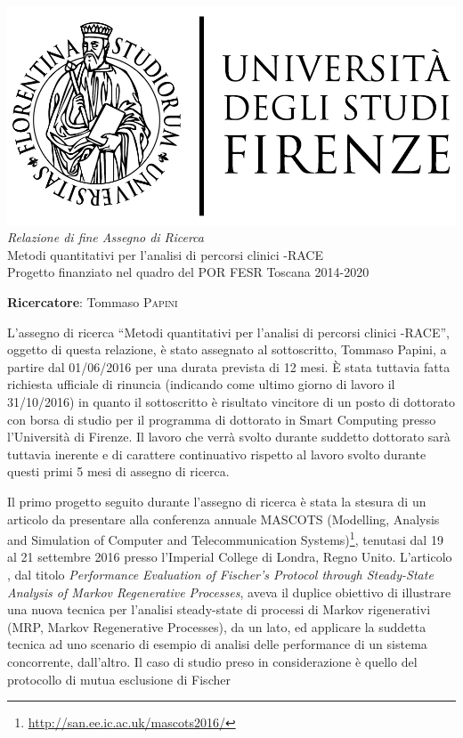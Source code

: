 \documentclass{article}
\begin{document}
    
    \begin{center}
        \includegraphics[scale=0.2]{logo_unifi.jpg}\\[4cm]
        \textit{Relazione di fine Assegno di Ricerca}\\[0.3cm]
        {\Huge Metodi quantitativi per l'analisi di percorsi clinici -RACE}\\[0.2cm]
        Progetto finanziato nel quadro del POR FESR Toscana 2014-2020
    \end{center}
    
    \vfill
    
    \textbf{Ricercatore}: Tommaso \textsc{Papini}
    
    \clearpage
    
    L'assegno di ricerca ``Metodi quantitativi per l'analisi di percorsi clinici -RACE'', oggetto di questa relazione, è stato assegnato al sottoscritto, Tommaso Papini, a partire dal 01/06/2016 per una durata prevista di 12 mesi. È stata tuttavia fatta richiesta ufficiale di rinuncia (indicando come ultimo giorno di lavoro il 31/10/2016) in quanto il sottoscritto è risultato vincitore di un posto di dottorato con borsa di studio per il programma di dottorato in Smart Computing presso l'Università di Firenze. Il lavoro che verrà svolto durante suddetto dottorato sarà tuttavia inerente e di carattere continuativo rispetto al lavoro svolto durante questi primi 5 mesi di assegno di ricerca.
    
    Il primo progetto seguito durante l'assegno di ricerca è stata la stesura di un articolo da presentare alla conferenza annuale MASCOTS (Modelling, Analysis and Simulation of Computer and Telecommunication Systems)\footnote{\url{http://san.ee.ic.ac.uk/mascots2016/}}, tenutasi dal 19 al 21 settembre 2016 presso l'Imperial College di Londra, Regno Unito. L'articolo \cite{mascots16}, dal titolo \textit{Performance Evaluation of Fischer's Protocol through Steady-State Analysis of Markov Regenerative Processes}, aveva il duplice obiettivo di illustrare una nuova tecnica per l'analisi steady-state di processi di Markov rigenerativi (MRP, Markov Regenerative Processes), da un lato, ed applicare la suddetta tecnica ad uno scenario di esempio di analisi delle performance di un sistema concorrente, dall'altro. Il caso di studio preso in considerazione è quello del protocollo di mutua esclusione di Fischer
    
    
    
    
    \clearpage
    
	
	
\end{document}
